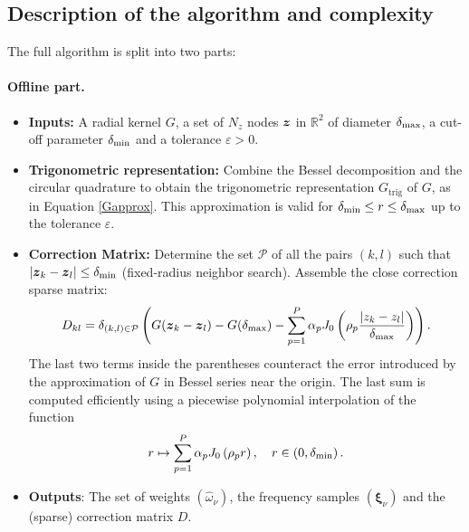 \documentclass[main]{subfiles}
\begin{document}
\subsection{Description of the algorithm and complexity}
\label{fullDescr}
The full algorithm is split into two parts:

\paragraph{Offline part.}
\begin{itemize}
	\item[]\textbf{Inputs:} A radial kernel $G$, a set of $N_z$ nodes $\boldsymbol{z}$ in $\mathbb{R}^2$ of diameter $\delta_{\max}$, a cut-off parameter $\delta_{\min}$ and a tolerance $\varepsilon > 0$.
	\item[]\textbf{Trigonometric representation:} Combine the Bessel decomposition and the circular quadrature to obtain the trigonometric representation $G_\text{trig}$ of $G$, as in Equation \eqref{Gapprox}. This approximation is valid for $\delta_{\min} \leq r\leq \delta_{\max}$ up to the tolerance $\varepsilon$. 
	\item[]\textbf{Correction Matrix:} Determine the set $\mathcal{P}$ of all the pairs $(k,l)$ such that $\left\lvert \boldsymbol{z}_k - \boldsymbol{z}_l \right\rvert \leq \delta_{\min}$ (fixed-radius neighbor search). Assemble the close correction sparse matrix:
	\begin{equation}
	\label{defD}
	D_{kl} = \delta_{(k,l) \in \mathcal{P}} \left( G({\boldsymbol{z}_k - \boldsymbol{z}_l}) - G(\delta_{\max}) - \sum_{p = 1}^{P} \alpha_p J_0\left(\rho_p\frac{\left\lvert z_k - z_l \right\rvert}{\delta_{\max}}\right)\right).
	\end{equation}
	The last two terms inside the parentheses counteract the error introduced by the approximation of $G$ in Bessel series near the origin. The last sum is computed efficiently using a piecewise polynomial interpolation of the function 
	\[ r\mapsto \sum_{p = 1}^{P} \alpha_p J_0\left(\rho_pr\right),\quad r \in \left(0,\delta_{\min}\right). \]
	\item[] \textbf{Outputs}: The set of weights $(\hat{\omega}_\nu)$, the frequency samples $(\boldsymbol{\xi}_\nu)$ and the (sparse) correction  matrix $D$. 
\end{itemize}
\end{document}
